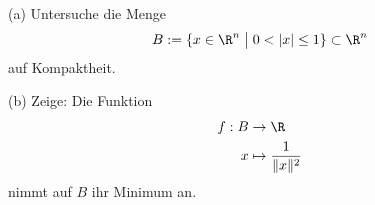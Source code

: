 \begin{prob}
(a) Untersuche die Menge 
$$B:=\{x\in\R^n\;\bigl|\;0<|x|\leq 1\} \subset \R^n$$ auf Kompaktheit.

(b) Zeige: Die Funktion 
\begin{equation*}
\begin{split}
f:B&\to\R\\
x&\mapsto \frac{1}{\|x\|^2}
\end{split}
\end{equation*}
nimmt auf $B$ ihr Minimum an.
\end{prob}
